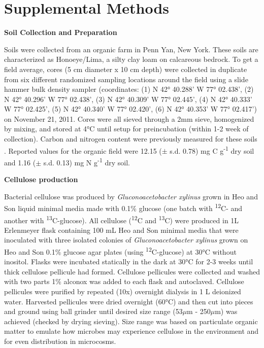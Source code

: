 \section{Supplemental Methods}


\textbf{Soil Collection and Preparation}



Soils were collected from an organic farm in Penn Yan, New York.  These soils are characterized as Honoeye/Lima, a silty clay loam on calcareous bedrock. To get a field average, cores (5 cm diameter x 10 cm depth) were collected in duplicate from six different randomized sampling locations around the field using a slide hammer bulk density sampler (coordinates: (1) N 42° 40.288’ W 77° 02.438’, (2) N 42° 40.296’ W 77° 02.438’, (3) N 42° 40.309’ W 77° 02.445’, (4) N 42° 40.333’ W 77° 02.425’, (5) N 42° 40.340’ W 77° 02.420’, (6) N 42° 40.353’ W 77° 02.417’) on November 21, 2011. Cores were all sieved through a 2mm sieve, homogenized by mixing, and stored at 4°C until setup for preincubation (within 1-2 week of collection).  Carbon and nitrogen content were previously measured for these soils \cite{Berthrong_2013}. Reported values for the organic field were 12.15 ($\pm$ s.d. 0.78) mg C g\textsuperscript{-1} dry soil and 1.16 ($\pm$ s.d. 0.13) mg N g\textsuperscript{-1} dry soil.



\textbf{Cellulose production}

Bacterial cellulose was produced by \textit{Gluconoacetobacter xylinus} grown in Heo and Son \cite{Heo_2002} liquid minimal media made with 0.1\% glucose (one batch with \textsuperscript{12}C- and another with \textsuperscript{13}C-glucose). All cellulose (\textsuperscript{12}C and \textsuperscript{13}C) were produced in 1L Erlenmeyer flask containing 100 mL Heo and Son minimal media that were inoculated with three isolated colonies of \textit{Gluconoacetobacter xylinus} grown on Heo and Son 0.1\% glucose agar plates (using \textsuperscript{12}C-glucose) at 30°C without inositol. Flasks were incubated statically in the dark at 30°C for 2-3 weeks until thick cellulose pellicule had formed.  Cellulose pellicules were collected and washed with two parts 1\% alconox was added to each flask and autoclaved. Cellulose pellicules were purified by repeated (10x) overnight dialysis in 1 L deionized water. Harvested pellicules were dried overnight (60°C) and then cut into pieces and ground using ball grinder until desired size range (53$\mu$m - 250$\mu$m) was achieved (checked by drying sieving). Size range was based on particulate organic matter to emulate how microbes may experience cellulose in the environment \cite{Cambardella_1992} and for even distribution in microcosms. 

